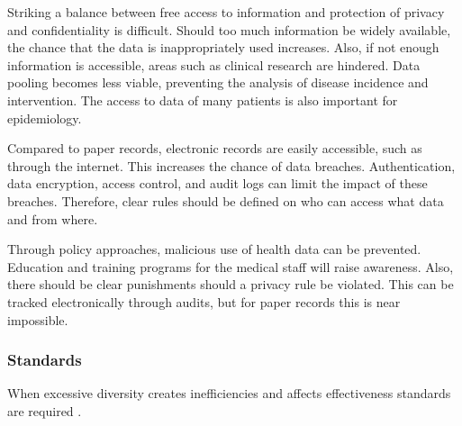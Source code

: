         Striking a balance between free access to information and protection of privacy and confidentiality is difficult. Should too much information be widely available, the chance that the data is inappropriately used increases. Also, if not enough information is accessible, areas such as clinical research are hindered. Data pooling becomes less viable, preventing the analysis of disease incidence and intervention. The access to data of many patients is also important for epidemiology.

        Compared to paper records, electronic records are easily accessible, such as through the internet. This increases the chance of data breaches. Authentication, data encryption, access control, and audit logs can limit the impact of these breaches. Therefore, clear rules should be defined on who can access what data and from where.

        Through policy approaches, malicious use of health data can be prevented. Education and training programs for the medical staff will raise awareness. Also, there should be clear punishments should a privacy rule be violated. This can be tracked electronically through audits, but for paper records this is near impossible.

        \subsubsection{Standards} \label{2_standards}

        When excessive diversity creates inefficiencies and affects effectiveness standards are required \cite{biomedical_informatics}.

        

        


